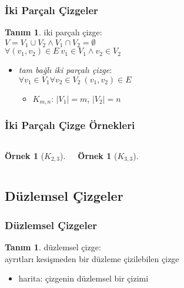 \documentclass[dvipsnames]{beamer}
\theoremstyle{definition}
\newtheorem{tanim}[theorem]{Tanım}
\theoremstyle{example}
\newtheorem{ornek}[theorem]{Örnek}
\theoremstyle{plain}
\begin{document}
\begin{frame}
  \frametitle{İki Parçalı Çizgeler}

  \begin{tanim}
    \alert{iki parçalı çizge}:\\
    $V = V_1 \cup V_2 \wedge V_1 \cap V_2 = \emptyset$\\
    $\forall (v_1,v_2) \in E~v_1 \in V_1 \wedge v_2 \in V_2$

    \pause
    \begin{itemize}
      \item \emph{tam bağlı iki parçalı çizge}:\\
      $\forall v_1 \in V_1 \forall v_2 \in V_2~(v_1,v_2) \in E$
      \begin{itemize}
        \item $K_{m,n}$: $|V_1|=m$, $|V_2|=n$
      \end{itemize}
    \end{itemize}
  \end{tanim}
\end{frame}

\begin{frame}
  \frametitle{İki Parçalı Çizge Örnekleri}

  \begin{columns}[t]
    \begin{ornek}[$K_{2,3}$]
      \begin{center}
      \end{center}
    \end{ornek}

    \begin{ornek}[$K_{3,3}$]
      \begin{center}
      \end{center}
    \end{ornek}
  \end{columns}
\end{frame}

\subsection{Düzlemsel Çizgeler}

\begin{frame}
  \frametitle{Düzlemsel Çizgeler}

  \begin{tanim}
    \alert{düzlemsel çizge}:\\
      ayrıtları kesişmeden bir düzleme çizilebilen çizge

    \begin{itemize}
      \item \alert{harita}: çizgenin düzlemsel bir çizimi
    \end{itemize}
  \end{tanim}
\end{frame}
\end{document}
